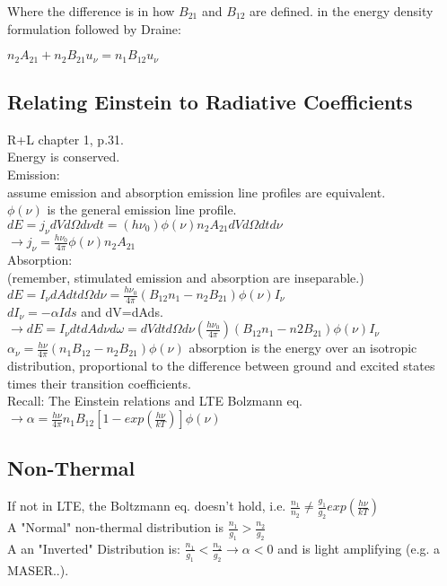 \documentclass[12pt]{report}
\begin{document}
Where the difference is in how $B_{21}$ and $B_{12}$ are defined. in the energy density formulation followed by Draine:

 \( n_2A_{21}+n_2B_{21}u_\nu = n_1B_{12}u_\nu  \)


\subsection{Relating Einstein to Radiative Coefficients}\label{sec:einsteinradiative}
R+L chapter 1, p.31.\\
Energy is conserved.\\
Emission:\\
assume emission and absorption emission line profiles are equivalent. \\
$\phi(\nu)$ is the general emission line profile.\\
\( dE=j_\nu dVd\Omega d\nu dt =(h\nu_0)\phi (\nu)n_2A_{21}dVd\Omega dt d\nu \) \\
\(\rightarrow \boxed{j_\nu=\frac{h\nu_0}{4\pi}\phi(\nu)n_2 A_{21} } \) \\
Absorption:\\
(remember, stimulated emission and absorption are inseparable.)\\
\( dE=I _\nu dAdt d\Omega d\nu =\frac{h\nu_0}{4\pi}(B_{12}n_1-n_2B_{21})\phi(\nu)I_\nu \)\\
$dI_\nu=-\alpha I ds$ and dV=dAds.\\
$\rightarrow dE=I_\nu dt dA d\nu d\omega=dVdtd\Omega d\nu(\frac{h\nu_0}{4\pi})(B_{12}n_1-n2B_{21})\phi(\nu)I_\nu$\\
\(\boxed{\alpha_\nu=\frac{h\nu}{4\pi}(n_1B_{12}-n_2B_{21})\phi(\nu) }\)
absorption is the energy over an isotropic distribution, proportional to the difference between ground and excited states times their transition coefficients.\\
Recall: The Einstein relations and LTE Bolzmann eq. \\
\( \rightarrow \alpha= \frac{h\nu}{4\pi}n_1B_{12}[1-exp(\frac{h\nu}{kT})]\phi(\nu)\)




\subsection{Non-Thermal}
If not in LTE, the Boltzmann eq. doesn't hold, i.e. \( \frac{n_1}{n_2} \neq \frac{g_1}{g_2}exp(\frac{h\nu}{kT}) \) \\
A "Normal" non-thermal distribution is $\frac{n_1}{g_1}>\frac{n_2}{g_2}$\\
A an "Inverted" Distribution is: $\frac{n_1}{g_1}<\frac{n_2}{g_2}\rightarrow \alpha<0 $ and is light amplifying (e.g. a MASER..).\\
\end{document}
